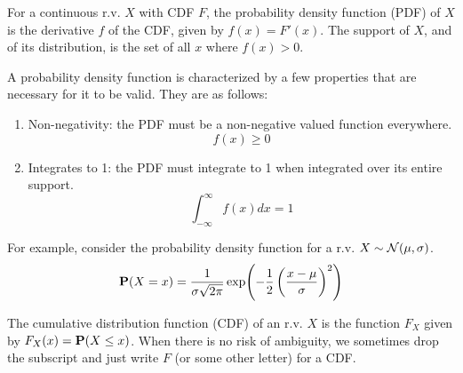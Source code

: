 
\begin{definition}
For a continuous r.v. $X$ with CDF $F$, the probability density function (PDF) of $X$ is the derivative $f$ of the CDF, given by $f(x) = F'(x)$. The support of $X$, and of its distribution, is the set of all $x$ where $f(x) > 0$.
\end{definition}

\begin{theorem}
A probability density function is characterized by a few properties that are necessary for it to be valid. They are as follows:
  \begin{enumerate}
    \item Non-negativity: the PDF must be a non-negative valued function everywhere.
      $$ f(x) \geq 0  $$
    \item Integrates to 1: the PDF must integrate to 1 when integrated over its entire support.
    $$ \int_{-\infty}^{\infty} f(x) dx = 1 $$
    \end{enumerate}
\end{theorem}

\begin{example}
For example, consider the probability density function for a r.v. $X \sim \Normal(\mu, \sigma)$.
$$\P(X = x) = \frac{1}{\sigma \sqrt{2 \pi}} \exp (-\frac{1}{2} \left(\frac{x - \mu}{\sigma}\right)^2 )$$
\end{example}


\begin{definition}
The cumulative distribution function (CDF) of an r.v. $X$ is the function $F_X$ given by $F_X(x) = \P (X \leq x)$. When there is no risk of ambiguity, we sometimes drop the subscript and just write $F$ (or some other letter) for a CDF.
\end{definition}


